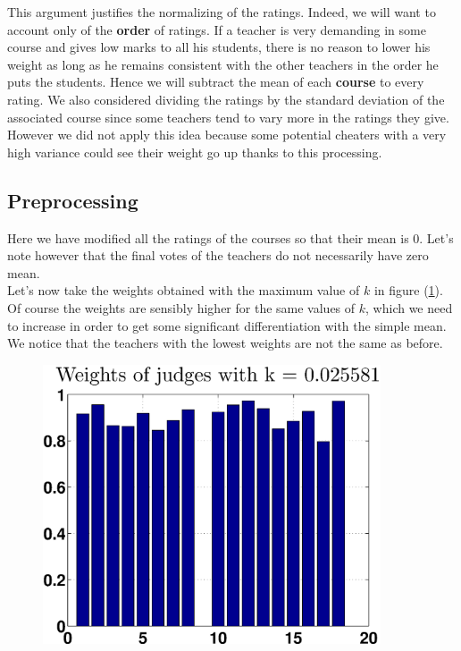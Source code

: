 \documentclass[12pt,a4paper]{article}
\begin{document}
This argument justifies the normalizing of the ratings. Indeed, we will want to account only of the \textbf{order} of ratings. If a teacher is very demanding in some course and gives low marks to all his students, there is no reason to lower his weight as long as he remains consistent with the other teachers in the order he puts the students. Hence we will subtract the mean of each \textbf{course} to every rating. We also considered dividing the ratings by the standard deviation of the associated course since some teachers tend to vary more in the ratings they give. However we did not apply this idea because some potential cheaters with a very high variance could see their weight go up thanks to this processing.
\FloatBarrier

\subsection*{Preprocessing}
Here we have modified all the ratings of the courses so that their mean is 0. Let's note however that the final votes of the teachers do not necessarily have zero mean. \\
Let's now take the weights obtained with the maximum value of $k$ in figure (\ref{weightprocess}). Of course the weights are sensibly higher for the same values of $k$, which we need to increase in order to get some significant differentiation with the simple mean. We notice that the teachers with the lowest weights are not the same as before.

\begin{figure}[h!]
\centering
\includegraphics[width = 10cm]{preprocess/ppweightsk3f9a31ee697a4e60.eps}
\caption{\label{weightprocess}}
\end{figure}
\end{document}
